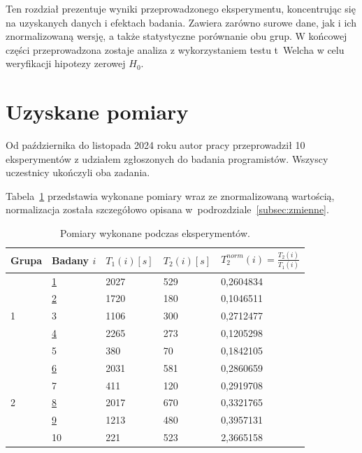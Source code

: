 Ten rozdział prezentuje wyniki przeprowadzonego eksperymentu, koncentrując się
na uzyskanych danych i efektach badania.
Zawiera zarówno surowe dane, jak i ich znormalizowaną wersję, a także
statystyczne porównanie obu grup.
W końcowej części przeprowadzona zostaje analiza z wykorzystaniem testu
t~Welcha w celu weryfikacji hipotezy zerowej \(H_{0}\).


\section{Uzyskane pomiary}

Od października do listopada 2024 roku autor pracy przeprowadził 10
eksperymentów z udziałem zgłoszonych do badania programistów.
Wszyscy uczestnicy ukończyli oba zadania.

Tabela~\ref{tab:czas_norm} przedstawia wykonane pomiary wraz ze znormalizowaną
wartością, normalizacja została szczegółowo opisana
w~podrozdziale~\ref{subsec:zmienne}.

\begin{table}[h]
    \centering
    \begin{tabular}{l|l|l|l|l}
        Grupa & Badany \(i\) & \(T_{1}(i) [s]\) & \(T_{2}(i) [s]\) &
        \(T_2^{norm}(i) = \frac{T_{2}(i)}{T_{1}(i)}\) \\\hline\hline
        \multirow{5}{*}{1} & \underline{1} & 2027 & 529 & 0,2604834 \\
        & \underline{2} & 1720 & 180 & 0,1046511 \\
        & 3             & 1106 & 300 & 0,2712477 \\
        & \underline{4} & 2265 & 273 & 0,1205298 \\
        & 5             & 380  & 70  & 0,1842105 \\ \hline
        \multirow{5}{*}{2} & \underline{6} & 2031 & 581 & 0,2860659 \\
        & 7             & 411  & 120 & 0,2919708 \\
        & \underline{8} & 2017 & 670 & 0,3321765 \\
        & \underline{9} & 1213 & 480 & 0,3957131 \\
        & 10            & 221  & 523 & 2,3665158 \\ \hline
    \end{tabular}
    \caption{\label{tab:czas_norm}Pomiary wykonane podczas eksperymentów.}
\end{table}

